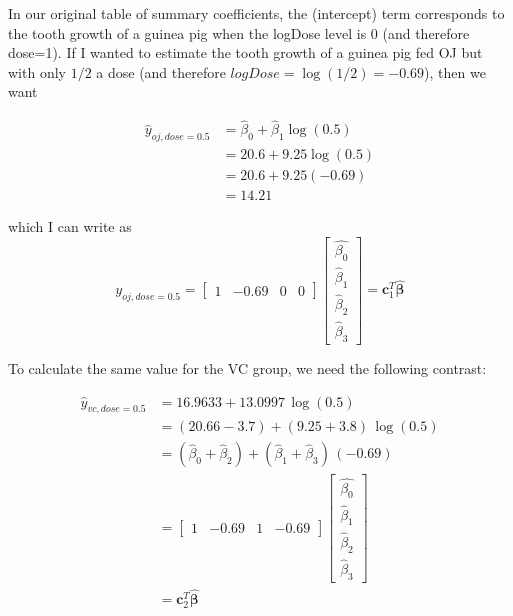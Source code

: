 \documentclass[]{book}
\theoremstyle{definition}
\theoremstyle{definition}
\theoremstyle{remark}
\begin{document}
In our original table of summary coefficients, the (intercept) term
corresponds to the tooth growth of a guinea pig when the logDose level
is 0 (and therefore dose=1). If I wanted to estimate the tooth growth of
a guinea pig fed OJ but with only \(1/2\) a dose (and therefore
\(logDose=\log\left(1/2\right)=-0.69\)), then we want

\[\begin{aligned}
\hat{y}_{oj,dose=0.5}   & =     \hat{\beta}_{0}+\hat{\beta}_{1}\log\left(0.5\right)\\
                        & =     20.6+9.25\log\left(0.5\right)\\
                        & =     20.6+9.25\left(-0.69\right)\\
                        & =     14.21
\end{aligned}\]

which I can write as \[y_{oj,dose=0.5}   =   \left[\begin{array}{cccc}
1 & -0.69 & 0 & 0\end{array}\right]\left[\begin{array}{c}
\hat{\beta_{0}}\\
\hat{\beta}_{1}\\
\hat{\beta}_{2}\\
\hat{\beta}_{3}
\end{array}\right]
    =   \boldsymbol{c}_{1}^{T}\hat{\boldsymbol{\beta}}\]

To calculate the same value for the VC group, we need the following
contrast:

\[\begin{aligned}
\hat{y}_{vc,dose=0.5}   
    &=  16.9633+13.0997\,\log\left(0.5\right)\\
    &=  \left(20.66-3.7\right)+\left(9.25+3.8\right)\,\log\left(0.5\right)\\
      &=    \left(\hat{\beta}_{0}+\hat{\beta}_{2}\right)+\left(\hat{\beta}_{1}+\hat{\beta}_{3}\right)\,\left(-0.69\right)\\
      &=    \left[\begin{array}{cccc}1 & -0.69 & 1 & -0.69\end{array}\right]\left[\begin{array}{c}
                 \hat{\beta_{0}}\\
                 \hat{\beta}_{1}\\
                 \hat{\beta}_{2}\\
                 \hat{\beta}_{3}\end{array}\right]\\
      &=    \boldsymbol{c}_{2}^{T}\hat{\boldsymbol{\beta}}
      \end{aligned}\]
\end{document}
